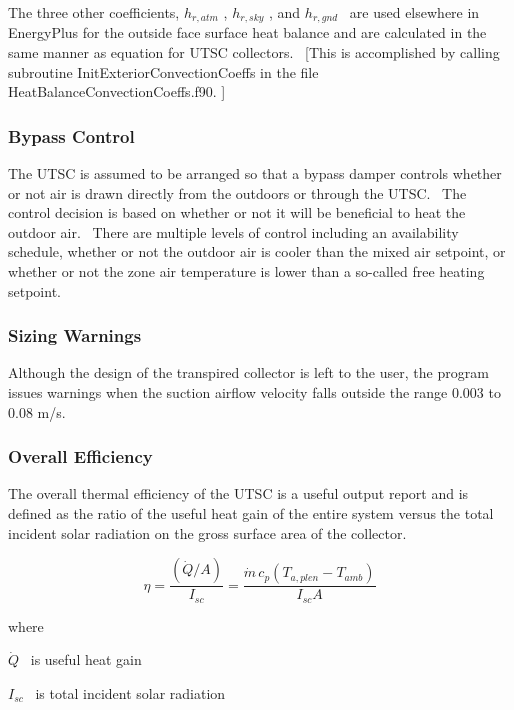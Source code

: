 The three other coefficients, \({h_{r,atm}}\) , \({h_{r,sky}}\) , and \({h_{r,gnd}}\) ~are used elsewhere in EnergyPlus for the outside face surface heat balance and are calculated in the same manner as equation for UTSC collectors.~ {[}This is accomplished by calling subroutine InitExteriorConvectionCoeffs in the file HeatBalanceConvectionCoeffs.f90. {]}

\subsubsection{Bypass Control}\label{bypass-control}

The UTSC is assumed to be arranged so that a bypass damper controls whether or not air is drawn directly from the outdoors or through the UTSC.~ The control decision is based on whether or not it will be beneficial to heat the outdoor air.~ There are multiple levels of control including an availability schedule, whether or not the outdoor air is cooler than the mixed air setpoint, or whether or not the zone air temperature is lower than a so-called free heating setpoint.

\subsubsection{Sizing Warnings}\label{sizing-warnings}

Although the design of the transpired collector is left to the user, the program issues warnings when the suction airflow velocity falls outside the range 0.003 to 0.08 m/s.

\subsubsection{Overall Efficiency}\label{overall-efficiency}

The overall thermal efficiency of the UTSC is a useful output report and is defined as the ratio of the useful heat gain of the entire system versus the total incident solar radiation on the gross surface area of the collector.

\begin{equation}
\eta  = \frac{{(\dot Q/A)}}{{{I_{sc}}}} = \frac{{\dot m\,{c_p}\left( {{T_{a,plen}} - {T_{amb}}} \right)}}{{{I_{sc}}A}}
\end{equation}

where

\(\dot Q\) ~is useful heat gain

\({I_{sc}}\) ~is total incident solar radiation

